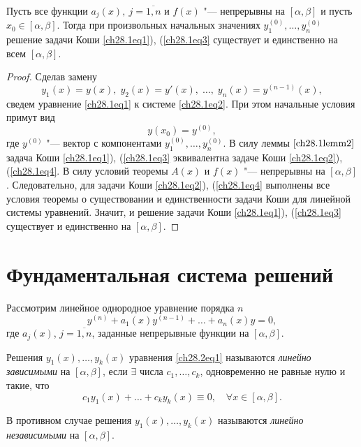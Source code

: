 \begin{thm}
Пусть все функции $a_j(x), \: j = \overline{1,n}$ и $f(x)$ "--- непрерывны на $[\alpha, \beta]$ и пусть $x_0 \in [\alpha, \beta]$. Тогда при произвольных начальных значениях $y_1^{(0)}, \ldots, y_n^{(0)}$ решение задачи Коши \eqref{ch28.1eq1}), \: (\ref{ch28.1eq3} существует и единственно на всем $[\alpha, \beta]$.
\end{thm}

\begin{proof}
Сделав замену 
$$
y_1(x) = y(x), \; y_2(x) = y'(x), \; \ldots, \; y_n(x) = y^{(n - 1)}(x),
$$
сведем уравнение \eqref{ch28.1eq1} к системе \eqref{ch28.1eq2}. При этом начальные условия примут вид
\begin{equation} \label{ch28.1eq4}
y(x_0) = y^{(0)},
\end{equation}
где $y^{(0)}$ "--- вектор с компонентами $y_1^{(0)}, \ldots, y_n^{(0)}$. В силу леммы $\ref{ch28.1lemm2}$ задача Коши \eqref{ch28.1eq1}), \: (\ref{ch28.1eq3} эквивалентна задаче Коши \eqref{ch28.1eq2}), \: (\ref{ch28.1eq4}. В силу условий теоремы $A(x)$ и $f(x)$ "--- непрерывны на $[\alpha, \beta]$. Следовательно, для задачи Коши \eqref{ch28.1eq2}), \: (\ref{ch28.1eq4} выполнены все условия теоремы о существовании и единственности задачи Коши для линейной системы уравнений. Значит, и решение задачи Коши \eqref{ch28.1eq1}), \: (\ref{ch28.1eq3} существует и единственно на $[\alpha, \beta]$.
\end{proof}
\section{Фундаментальная система решений}

Рассмотрим линейное однородное уравнение порядка $n$
\begin{equation} \label{ch28.2eq1}
y^{(n)} + a_1(x)y^{(n - 1)} + \ldots + a_n(x)y = 0,
\end{equation} 
где $a_j(x)$, $j = \overline{1,n}$, заданные непрерывные функции на $[\alpha, \beta]$.

\begin{defn}
Решения $y_1(x), \ldots, y_k(x)$ уравнения \eqref{ch28.2eq1} называются \textit{линейно зависимыми} на $[\alpha, \beta]$, если $\exists$ числа $c_1, \ldots, c_k$, одновременно не равные нулю и такие, что 
$$
c_1y_1(x) + \ldots + c_ky_k(x) \equiv 0, \quad \forall x \in [\alpha, \beta].
$$

В противном случае решения $y_1(x), \ldots, y_k(x)$ называются \textit{линейно независимыми} на $[\alpha, \beta]$.
\end{defn}

